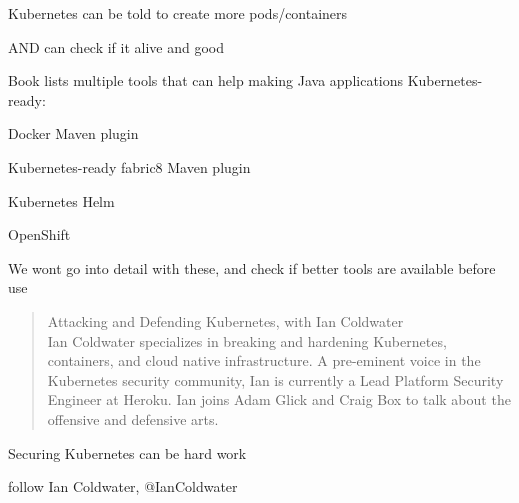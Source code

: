 \documentclass[Screen16to9,17pt]{foils}
\begin{document}

\begin{list2}
\item Kubernetes can be told to create more pods/containers
\item AND can check if it alive and good
\end{list2}





\begin{quote}

\end{quote}

Book lists multiple tools that can help making Java applications Kubernetes-ready:
\begin{list2}
\item Docker Maven plugin
\item Kubernetes-ready fabric8 Maven plugin
\item Kubernetes Helm
\item OpenShift
\end{list2}

We wont go into detail with these, and check if better tools are available before use



\begin{quote}
  Attacking and Defending Kubernetes, with Ian Coldwater\\
  Ian Coldwater specializes in breaking and hardening Kubernetes, containers, and cloud native infrastructure. A pre-eminent voice in the Kubernetes security community, Ian is currently a Lead Platform Security Engineer at Heroku. Ian joins Adam Glick and Craig Box to talk about the offensive and defensive arts.
\end{quote}
{\footnotesize{}}

\begin{list2}
  \item Securing Kubernetes can be hard work
  \item
  \item follow Ian Coldwater, @IanColdwater 
\end{list2}
\end{document}
